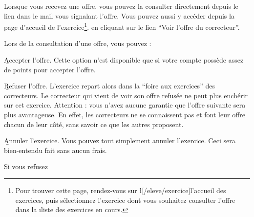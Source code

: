 ﻿Lorsque vous recevez une offre, vous pouvez la consulter directement depuis le lien dans le mail vous signalant l’offre. Vous pouvez aussi y accéder depuis la page d’accueil de l’exercice\footnote{Pour trouver cette page, rendez-vous sur \l[/eleve/exercice]{l’accueil des exercices}, puis sélectionnez l’exercice dont vous souhaitez consulter l’offre dans la \i{liste des exercices en cours}.}. en cliquant sur le lien “Voir l’offre du correcteur”.

Lors de la consultation d’une offre, vous pouvez :
\item \b{Accepter l’offre}. Cette option n’est disponible que si votre compte possède assez de points pour accepter l’offre.
\item \b{Refuser l’offre}. L’exercice repart alors dans la “foire aux exercices” des correcteurs. Le correcteur qui vient de voir son offre refusée ne peut plus enchérir sur cet exercice. Attention : vous n’avez aucune garantie que l’offre suivante sera plus avantageuse. En effet, les correcteurs ne se connaissent pas et font leur offre chacun de leur côté, sans savoir ce que les autres proposent.
\item \b{Annuler l’exercice}. Vous pouvez tout simplement annuler l’exercice. Ceci sera bien-entendu fait sans aucun frais.

Si vous refusez %